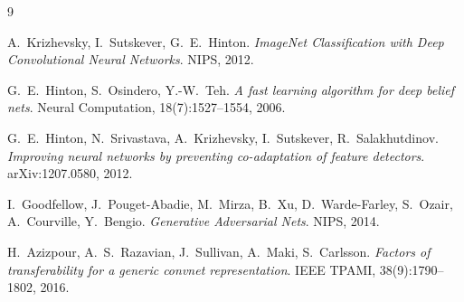 \documentclass[a4paper,11pt]{article}
\theoremstyle{definition}
\theoremstyle{remark}
\begin{document}
\begin{thebibliography}{9}

  A.~Krizhevsky, I.~Sutskever, G.~E.~Hinton.
  \newblock \emph{ImageNet Classification with Deep Convolutional
    Neural Networks}.
  \newblock NIPS, 2012.

  G.~E.~Hinton, S.~Osindero, Y.-W.~Teh.
  \newblock \emph{A fast learning algorithm for deep belief nets}.
  \newblock Neural Computation, 18(7):1527--1554, 2006.

  G.~E.~Hinton, N.~Srivastava, A.~Krizhevsky, I.~Sutskever,
  R.~Salakhutdinov.
  \newblock \emph{Improving neural networks by preventing
    co-adaptation of feature detectors}.
  \newblock arXiv:1207.0580, 2012.

  I.~Goodfellow, J.~Pouget-Abadie, M.~Mirza, B.~Xu, D.~Warde-Farley,
  S.~Ozair, A.~Courville, Y.~Bengio.
  \newblock \emph{Generative Adversarial Nets}.
  \newblock NIPS, 2014.

  H.~Azizpour, A.~S.~Razavian, J.~Sullivan, A.~Maki, S.~Carlsson.
  \newblock \emph{Factors of transferability for a generic convnet
    representation}.
  \newblock IEEE TPAMI, 38(9):1790--1802, 2016.

\end{thebibliography}
\end{document}
